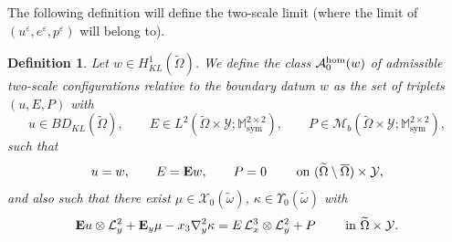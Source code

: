 \documentclass[reqno,10pt]{amsart}
\numberwithin{equation}{section}
\newtheorem{definition}[theorem]{Definition}
\theoremstyle{remark}
\newcommand{\calA}{\mathcal{A}}
\newcommand{\calL}{\mathcal{L}}
\newcommand{\M}{\mathbb{M}}
\newcommand{\calY}{\mathcal{Y}}
\DeclareMathOperator{\sym}{sym}
\newcommand{\closure}[1]{\overline{#1}}
\newcommand{\eps}{\varepsilon}
\newcommand{\Mb}{\mathcal{M}_b}
\newcommand{\calXzero}[1]{\mathcal{X}_0({#1})}
\newcommand{\calYzero}[1]{\Upsilon_0({#1})}
\newcommand{\ext}[1]{\widetilde{#1}}
\newcommand{\E}{{\bf E}}
\newcommand{\D}{\nabla}
\begin{document}
The following definition will define the two-scale limit (where the limit of $(u^\eps, e^{\eps}, p^{\eps})$ will belong to). 
\begin{definition} \label{definition A^hom_0}
Let $w \in H^1_{KL}(\ext{\Omega})$. 
We define the class $\calA^{\rm hom}_{0}(w)$ of admissible two-scale configurations relative to the boundary datum $w$ as the set of triplets $(u,E,P)$ with
\begin{equation*}
	u \in BD_{KL}(\ext{\Omega}), \qquad E \in L^2(\ext{\Omega} \times \calY;\M^{2 \times 2}_{\sym}), \qquad P \in \Mb(\ext{\Omega} \times \calY;\M^{2 \times 2}_{\sym}),
\end{equation*}
such that
\begin{equation*}
	u = w, \qquad E = {\E}w, \qquad P = 0 \qquad \text{ on } (\ext{\Omega} \setminus \closure{\Omega}) \times \calY,
\end{equation*}
and also such that there exist $\mu \in \calXzero{\ext{\omega}}$, $\kappa \in \calYzero{\ext{\omega}}$ with
\begin{equation} \label{admissible two-scale configurations - regime zero}
	{\E}u \otimes \calL^{2}_{y} + {\E}_{y}\mu - x_3 {\D}^2_{y}\kappa = E \,\calL^{3}_{x} \otimes \calL^{2}_{y} + P \qquad \text{ in } \ext{\Omega} \times \calY.
\end{equation}
\end{definition}
\end{document}
